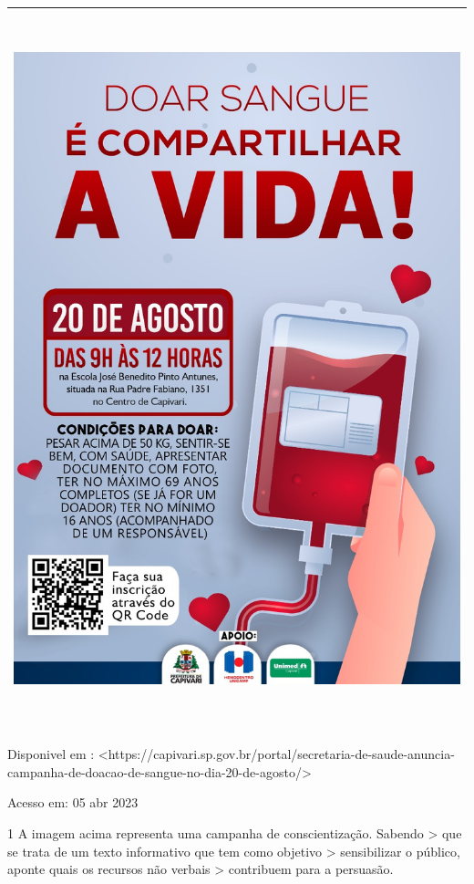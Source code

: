 {\begin{longtable}[]{@{}l@{}}
\toprule
\endhead
\includegraphics[width=5.76042in,height=8.15278in]{./imgSAEB_7_POR/media/image1.png} \\
\bottomrule
\end{longtable}

Disponivel em :
\textless https://capivari.sp.gov.br/portal/secretaria-de-saude-anuncia-campanha-de-doacao-de-sangue-no-dia-20-de-agosto/\textgreater{}

Acesso em: 05 abr 2023

\num{1} A imagem acima representa uma campanha de conscientização. Sabendo \textgreater{} que se trata de um texto informativo que tem como objetivo \textgreater{} sensibilizar o público, aponte quais os recursos não verbais \textgreater{} contribuem para a persuasão.

}
